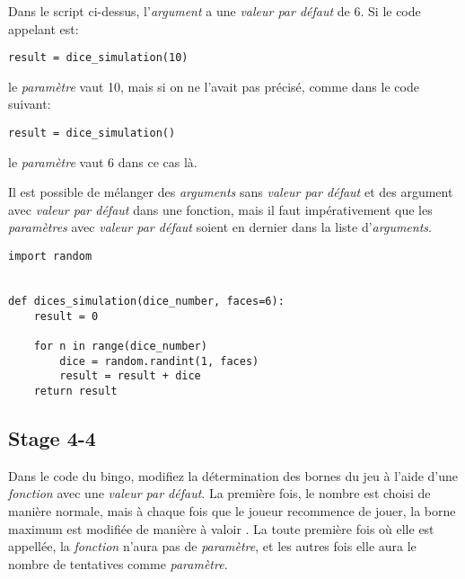 Dans le script ci-dessus, l'\emph{argument} a une \emph{valeur par défaut} de 6.
Si le code appelant est:
\begin{lstlisting}
result = dice_simulation(10)
\end{lstlisting}

le \emph{paramètre}  vaut 10, mais si on ne l'avait pas précisé, comme dans le code suivant:

\begin{lstlisting}
result = dice_simulation()
\end{lstlisting}

le \emph{paramètre}  vaut 6 dans ce cas là.

Il est possible de mélanger des \emph{arguments} sans \emph{valeur par défaut} et des argument avec \emph{valeur par défaut} dans une fonction, mais il faut impérativement que les \emph{paramètres} avec \emph{valeur par défaut} soient en dernier dans la liste d'\emph{arguments}.

\begin{lstlisting}
import random


def dices_simulation(dice_number, faces=6):
	result = 0
	
	for n in range(dice_number)
		dice = random.randint(1, faces)
		result = result + dice
	return result
\end{lstlisting}

\subsection{Stage 4-4}

Dans le code du bingo, modifiez la détermination des bornes du jeu à l'aide d'une \emph{fonction} avec une \emph{valeur par défaut}.
La première fois, le nombre est choisi de manière normale, mais à chaque fois que le joueur recommence de jouer, la borne maximum est modifiée de manière à valoir .
La toute première fois où elle est appellée, la \emph{fonction} n'aura pas de \emph{paramètre}, et les autres fois elle aura le nombre de tentatives comme \emph{paramètre}.